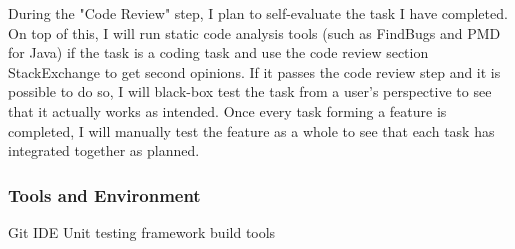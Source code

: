 \documentclass[]{report}
\begin{document}
		During the "Code Review" step, I plan to self-evaluate the task I have completed. On top of this, I will run static code analysis tools (such as FindBugs and PMD for Java) if the task is a coding task and use the code review section StackExchange to get second opinions. If it passes the code review step and it is possible to do so, I will black-box test the task from a user's perspective to see that it actually works as intended. Once every task forming a feature is completed, I will manually test the feature as a whole to see that each task has integrated together as planned.
		
		\subsubsection*{Tools and Environment}
		Git
		IDE
		Unit testing framework
		build tools
		
\end{document}
